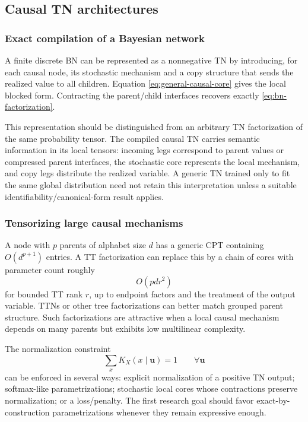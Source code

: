 \documentclass[11pt]{article}
\theoremstyle{remark}
\begin{document}
\subsection{Causal TN architectures}

\subsubsection{Exact compilation of a Bayesian network}

A finite discrete BN can be represented as a nonnegative TN by introducing, for each causal node, its stochastic mechanism and a copy structure that sends the realized value to all children. Equation \eqref{eq:general-causal-core} gives the local blocked form. Contracting the parent/child interfaces recovers exactly \cref{eq:bn-factorization}.

This representation should be distinguished from an arbitrary TN factorization of the same probability tensor. The compiled causal TN carries semantic information in its local tensors: incoming legs correspond to parent values or compressed parent interfaces, the stochastic core represents the local mechanism, and copy legs distribute the realized variable. A generic TN trained only to fit the same global distribution need not retain this interpretation unless a suitable identifiability/canonical-form result applies.

\subsubsection{Tensorizing large causal mechanisms}

A node with $p$ parents of alphabet size $d$ has a generic CPT containing $O(d^{p+1})$ entries. A TT factorization can replace this by a chain of cores with parameter count roughly
\begin{equation}
O(p d r^2)
\end{equation}
for bounded TT rank $r$, up to endpoint factors and the treatment of the output variable. TTNs or other tree factorizations can better match grouped parent structure. Such factorizations are attractive when a local causal mechanism depends on many parents but exhibits low multilinear complexity.

The normalization constraint
\begin{equation}
\sum_x K_X(x\mid\bm u)=1\qquad\forall\bm u
\label{eq:mechanism-normalization}
\end{equation}
can be enforced in several ways: explicit normalization of a positive TN output; softmax-like parametrizations; stochastic local cores whose contractions preserve normalization; or a loss/penalty. The first research goal should favor exact-by-construction parametrizations whenever they remain expressive enough.
\end{document}
